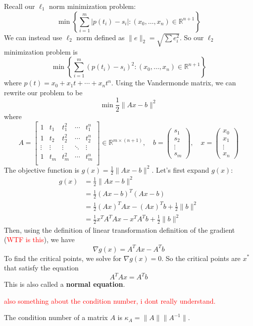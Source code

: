 \begin{problem}
  Recall our $\ell_1$ norm minimization problem:
  $$\min \left\{\sum^m_{i=1}|p(t_i) - s_i| : (x_0,\ldots,x_n) \in \mathbb R^{n+1}\right\}$$
  We can instead use $\ell_2$ norm defined as $\|e\|_2 = \sqrt{\sum e_i^2}$. So our $\ell_2$ minimization problem is $$\min \left\{\sum^m_{i=1}(p(t_i) - s_i)^2 : (x_0,\ldots,x_n) \in \mathbb R^{n+1}\right\}$$ where $p(t) = x_0 + x_1t + \cdots + x_nt^n$. Using the Vandermonde matrix, we can rewrite our problem to be
  $$\min \frac{1}{2} \|Ax - b\|^2$$ where $$A = \begin{bmatrix}
    1 & t_1 & t_1^2 & \cdots & t_1^n\\
    1 & t_2 & t_2^2 & \cdots & t_2^n\\
    \vdots & \vdots & \vdots & \ddots & \vdots\\
    1 & t_m & t_m^2 & \cdots & t_m^n\\
  \end{bmatrix} \in \mathbb R^{m \times (n+1)}, \quad b = \begin{pmatrix}
    s_1 \\ s_2 \\ \vdots \\ s_m
  \end{pmatrix}, \quad x = \begin{pmatrix}
    x_0 \\ x_1 \\ \vdots \\ x_n
  \end{pmatrix}$$
  The objective function is $g(x) = \frac{1}{2}\|Ax - b\|^2$. Let's first expand $g(x)$:
  \begin{align*}
    g(x) &= \frac{1}{2} \|Ax - b \|^2 \\
    &= \frac{1}{2}(Ax - b)^T (Ax - b) \\
    &= \frac{1}{2} (Ax)^T Ax - (Ax)^Tb + \frac{1}{2} \|b \|^2 \\
    &= \frac{1}{2} x^T A^T Ax - x^T A^T b + \frac{1}{2} \|b \|^2 
  \end{align*}
  Then, using the definition of linear transformation definition of the gradient (\textcolor{red}{WTF is this}), we have $$\nabla g(x) = A^T Ax - A^T b$$
  To find the critical points, we solve for $\nabla g(x) = 0$. So the critical points are $x^*$ that satisfy the equation
  $$A^TAx = A^Tb$$
  This is also called a \textbf{normal equation}.

  \textcolor{red}{also something about the condition number, i dont really understand.}
\end{problem}
\begin{definition}
  The condition number of a matrix $A$ is $\kappa_A = \|A \| \| A^{-1} \|$.
\end{definition}

